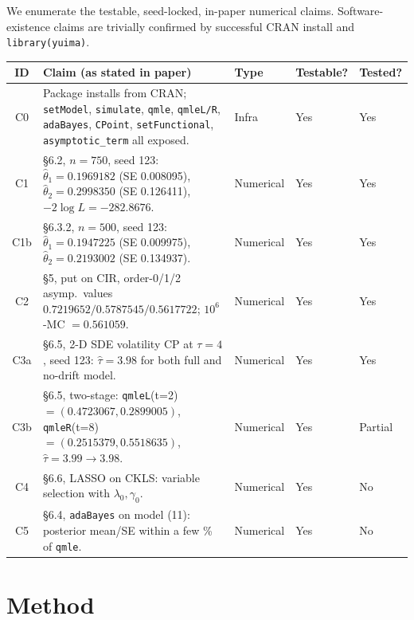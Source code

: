 \documentclass[11pt]{article}
\begin{document}
We enumerate the testable, seed-locked, in-paper numerical claims.
Software-existence claims are trivially confirmed by successful CRAN
install and \texttt{library(yuima)}.

\begin{longtable}{c p{7.5cm} l l l}
\toprule
ID & Claim (as stated in paper) & Type & Testable? & Tested? \\
\midrule
\endhead
C0  & Package installs from CRAN; \texttt{setModel}, \texttt{simulate}, \texttt{qmle}, \texttt{qmleL/R}, \texttt{adaBayes}, \texttt{CPoint}, \texttt{setFunctional}, \texttt{asymptotic\_term} all exposed. & Infra & Yes & Yes \\
C1  & \S6.2, $n{=}750$, seed 123: $\hat\theta_1{=}0.1969182$ (SE 0.008095), $\hat\theta_2{=}0.2998350$ (SE 0.126411), $-2\log L{=}-282.8676$. & Numerical & Yes & Yes \\
C1b & \S6.3.2, $n{=}500$, seed 123: $\hat\theta_1{=}0.1947225$ (SE 0.009975), $\hat\theta_2{=}0.2193002$ (SE 0.134937). & Numerical & Yes & Yes \\
C2  & \S5, put on CIR, order-0/1/2 asymp.\ values $0.7219652 / 0.5787545 / 0.5617722$; $10^6$-MC $= 0.561059$. & Numerical & Yes & Yes \\
C3a & \S6.5, 2-D SDE volatility CP at $\tau{=}4$, seed 123: $\hat\tau{=}3.98$ for both full and no-drift model. & Numerical & Yes & Yes \\
C3b & \S6.5, two-stage: \texttt{qmleL}(t=2) $=(0.4723067,0.2899005)$, \texttt{qmleR}(t=8) $=(0.2515379,0.5518635)$, $\hat\tau{=}3.99 \to 3.98$. & Numerical & Yes & Partial \\
C4  & \S6.6, LASSO on CKLS: variable selection with $\lambda_0,\gamma_0$. & Numerical & Yes & No \\
C5  & \S6.4, \texttt{adaBayes} on model (11): posterior mean/SE within a few \% of \texttt{qmle}. & Numerical & Yes & No \\
\bottomrule
\end{longtable}

\section{Method}
\end{document}
